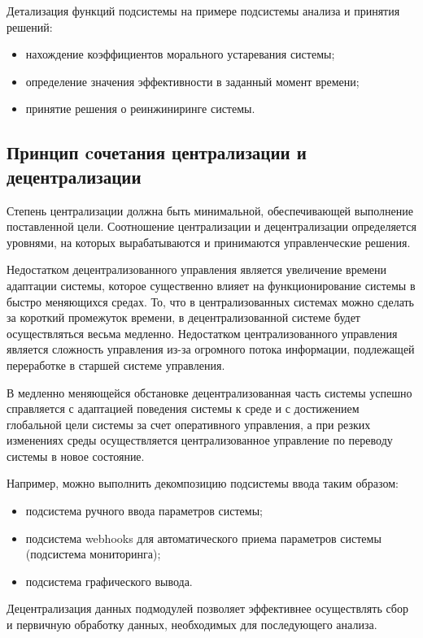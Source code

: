 Детализация функций подсистемы на примере подсистемы анализа и принятия решений:
\begin{itemize}
    \item нахождение коэффициентов морального устаревания системы;
    \item определение значения эффективности в заданный момент времени;
    \item принятие решения о реинжиниринге системы.
\end{itemize}

\subsection{Принцип cочетания централизации и децентрализации}
Степень централизации должна быть минимальной, обеспечивающей выполнение поставленной цели. 
Соотношение централизации и децентрализации определяется уровнями, на которых вырабатываются и принимаются управленческие решения.

Недостатком децентрализованного управления является увеличение времени адаптации системы, которое существенно влияет на функционирование системы в быстро меняющихся средах. 
То, что в централизованных системах можно сделать за короткий промежуток времени, в децентрализованной системе будет осуществляться весьма медленно. 
Недостатком централизованного управления является сложность управления из-за огромного потока информации, подлежащей переработке в старшей системе управления. 

В медленно меняющейся обстановке децентрализованная часть системы успешно справляется с адаптацией поведения системы к среде и с достижением глобальной цели системы за счет оперативного управления, а при резких изменениях среды осуществляется централизованное управление по переводу системы в новое состояние.

Например, можно выполнить декомпозицию подсистемы ввода таким образом:
\begin{itemize}
    \item подсистема ручного ввода параметров системы;
    \item подсистема webhooks для автоматического приема параметров системы (подсистема мониторинга);
    \item подсистема графического вывода.
\end{itemize}

Децентрализация данных подмодулей позволяет эффективнее осуществлять сбор и первичную обработку данных, необходимых для последующего анализа.

